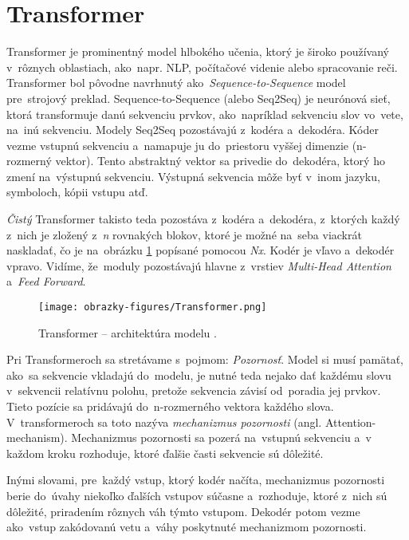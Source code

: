 \section{Transformer}

Transformer \cite{Vaswani:2017} je prominentný model hlbokého učenia, ktorý je široko používaný v~rôznych oblastiach, ako~napr. NLP, počítačové videnie alebo spracovanie reči.
Transformer bol pôvodne navrhnutý ako~\textit{Sequence-to-Sequence} model pre~strojový preklad. Sequence-to-Sequence (alebo Seq2Seq) je neurónová sieť, ktorá transformuje danú sekvenciu prvkov, ako~napríklad sekvenciu slov vo~vete, na~inú sekvenciu. Modely Seq2Seq pozostávajú z~kodéra a~dekodéra. Kóder vezme vstupnú sekvenciu a~namapuje ju do~priestoru vyššej dimenzie (n-rozmerný vektor). Tento abstraktný vektor sa privedie do~dekodéra, ktorý ho zmení na~výstupnú sekvenciu. Výstupná sekvencia môže byť v~inom jazyku, symboloch, kópii vstupu atď.

\textit{Čistý} Transformer takisto teda pozostáva z~kodéra a~dekodéra, z~ktorých každý z~nich je zložený z~\textit{n} rovnakých blokov, ktoré je možné na~seba viackrát naskladať, čo je na~obrázku \ref{transformer} popísané pomocou \textit{Nx}. Kodér je vľavo a~dekodér vpravo. Vidíme, že~moduly pozostávajú hlavne z~vrstiev \textit{Multi-Head Attention} a~\textit{Feed Forward}.

\begin{figure}[ht!]
	\centering
	\texttt{[image: obrazky-figures/Transformer.png]}
	\caption{Transformer -- architektúra modelu \cite{Vaswani:2017}.}
	\label{transformer}
\end{figure}

Pri Transformeroch sa stretávame s~pojmom: \textit{Pozornosť}. Model si musí pamätať, ako~sa sekvencie vkladajú do~modelu, je nutné teda nejako dať každému slovu v~sekvencii relatívnu polohu, pretože sekvencia závisí od~poradia jej prvkov. Tieto pozície sa pridávajú do~n-rozmerného vektora každého slova. V~transformeroch sa toto nazýva \textit{mechanizmus pozornosti} (angl. Attention-mechanism). Mechanizmus pozornosti sa pozerá na~vstupnú sekvenciu a~v každom kroku rozhoduje, ktoré ďalšie časti sekvencie sú dôležité.

Inými slovami, pre~každý vstup, ktorý kodér načíta, mechanizmus pozornosti berie do~úvahy niekoľko ďalších vstupov súčasne a~rozhoduje, ktoré z~nich sú dôležité, priradením rôznych váh týmto vstupom. Dekodér potom vezme ako~vstup zakódovanú vetu a~váhy poskytnuté mechanizmom pozornosti.

